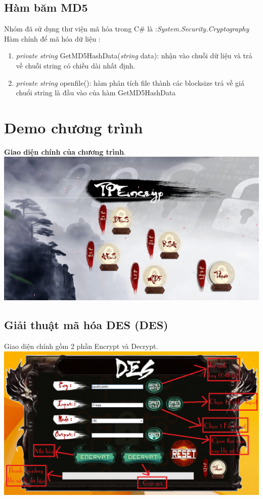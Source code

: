 \documentclass[paper=a4, fontsize=11pt]{scrartcl}	%
\numberwithin{equation}{section}															%
\numberwithin{figure}{section}																%
\numberwithin{table}{section}																%
\begin{document}
\subsection{Hàm băm MD5}
Nhóm đã sử dụng thư viện mã hóa trong C\# là :\hspace{0.2cm}\emph{System.Security.Cryptography}  \\
	Hàm chính để mã hóa dữ liệu :
	\begin{enumerate}
	\item \emph{private string} GetMD5HashData(\emph{string} data): nhận vào chuỗi dữ liệu và trả về chuỗi string có chiều dài nhất định.
	\item \emph{private string} openfile(): hàm phân tích file thành các blocksize trả về giá chuổi string là đầu vào của hàm GetMD5HashData
	\end{enumerate}
	\newpage

 
\section{Demo chương trình}
\textbf {Giao diện chính của chương trình}.\\

\includegraphics[scale = 0.4]{backroud}

 	\subsection{Giải thuật mã hóa DES  (DES)}
 	Giao diện chính gồm 2 phần Encrypt và Decrypt.\\
 
		\includegraphics[scale=0.4]{DES_Chucnang}
\end{document}
